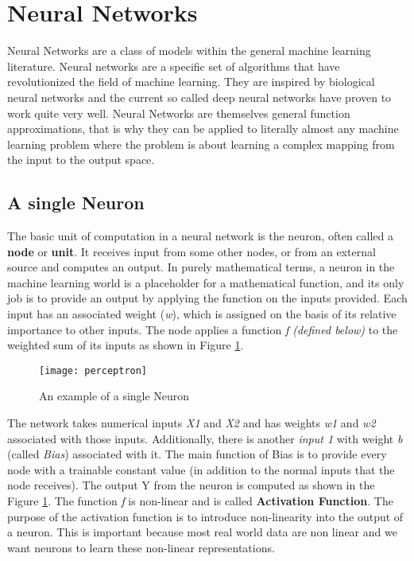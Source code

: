 \documentclass{report}
\begin{document}
\section{Neural Networks}
Neural Networks are a class of models within the general machine learning literature. Neural networks are a specific set of algorithms that
have revolutionized the field of machine learning. They are inspired by biological neural networks and the current so called deep neural
networks have proven to work quite very well. Neural Networks are themselves general function approximations, that is why they can be applied
to literally almost any machine learning problem where the problem is about learning a complex mapping from the input to the output space.

\subsection{A single Neuron}
The basic unit of computation in a neural network is the neuron, often called a \textbf{node} or \textbf{unit}. It receives input from some
other nodes, or from an external source and computes an output. In purely mathematical terms, a neuron in the machine learning world is a
placeholder for a mathematical function, and its only job is to provide an output by applying the function on the inputs provided.
Each input has an associated weight (\textit{w}), which is assigned on the basis of its relative importance to other inputs. The node applies
a function \textit{f  (defined below)} to the weighted sum of its inputs as shown in Figure \ref{fig:Perceptron}.
\begin{figure}[h]
  \centering
  \texttt{[image: perceptron]}
  \caption{An example of a single Neuron}
  \label{fig:Perceptron}
\end{figure}
The network takes numerical inputs \textit{X1} and \textit{X2} and has weights \textit{w1} and \textit{w2} associated with those inputs.
Additionally, there is another \textit{input 1} with weight \textit{b} (called \textit{Bias}) associated with it. The main function of Bias is to provide every node with a trainable constant value (in addition to the normal inputs that the node receives). The output Y from the neuron
is computed as shown in the Figure \ref{fig:Perceptron}. The function \textit{f} is non-linear and is called \textbf{Activation Function}. The
purpose of the activation function is to introduce non-linearity into the output of a neuron. This is important because most real world data
are non linear and we want neurons to learn these non-linear representations.
\end{document}
